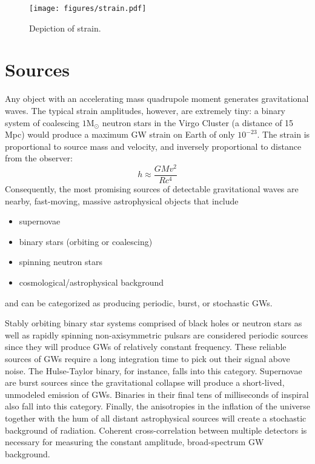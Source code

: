 \begin{figure}
\begin{centering}
\texttt{[image: figures/strain.pdf]}
\caption[Depiction of strain]{Depiction of strain.}
\label{fig:strain}
\end{centering}
\end{figure}



\section{Sources}
Any object with an accelerating mass quadrupole moment generates
gravitational waves. The typical strain amplitudes, however, are
extremely tiny: a binary system of coalescing $1 \mbox{M}_\odot$
neutron stars in the Virgo Cluster (a distance of 15 Mpc) would
produce a maximum GW strain on Earth of only
$10^{-23}$. 
The strain is proportional to source mass and velocity, and inversely
proportional to distance from the observer:
\begin{equation}
h \approx \frac{GMv^2}{Rc^4}
\end{equation}
Consequently, the most promising sources of detectable gravitational
waves are nearby, fast-moving, massive astrophysical objects that
include
\begin{itemize}
\item supernovae \vspace{-10pt}
\item binary stars (orbiting or coalescing) \vspace{-10pt}
\item spinning neutron stars \vspace{-10pt}
\item cosmological/astrophysical background
\end{itemize}
and can be categorized as producing periodic, burst, or stochastic GWs.

Stably orbiting binary star systems comprised of black holes or
neutron stars as well as rapidly spinning non-axisymmetric pulsars are
considered periodic sources since they will produce GWs of relatively
constant frequency. These reliable sources of GWs require a long
integration time to pick out their signal above noise. The
Hulse-Taylor binary, for instance, falls into this
category. Supernovae are burst sources since the gravitational
collapse will produce a short-lived, unmodeled emission of
GWs. Binaries in their final tens of milliseconds of inspiral also
fall into this category. Finally, the anisotropies in the inflation of
the universe together with the hum of all distant astrophysical
sources will create a stochastic background of radiation. Coherent
cross-correlation between multiple detectors is necessary for
measuring the constant amplitude, broad-spectrum GW
background. \cite{Maggiore2000Gravitational}

